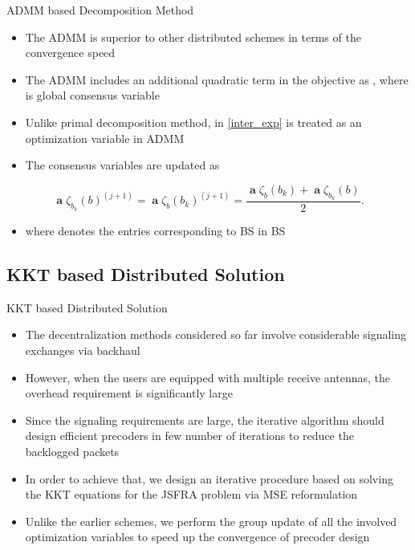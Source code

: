 \documentclass[10pt]{beamer}
\begin{document}
\begin{frame}{ADMM based Decomposition Method}
	\begin{itemize}
		\item The \ac{ADMM} is superior to other distributed schemes in terms of the convergence speed
		\item The \ac{ADMM} includes an additional quadratic term in the objective as , where  is global consensus variable
		\item Unlike primal decomposition method,  in \eqref{inter_exp} is treated as an optimization variable in \ac{ADMM}
		\item The consensus variables are updated as
	\end{itemize}
	\begin{equation}
	\mbfa{\zeta}_{b_k}(b)^{(j+1)} = \mbfa{\zeta}_{b}(b_k)^{(j+1)} = \frac{\mbfa{\zeta}_{b}(b_k) + \mbfa{\zeta}_{b_k}(b)}{2}.
	\label{if-sg-update}
	\end{equation}
	\begin{itemize}
		\item where  denotes the entries corresponding to \ac{BS}  in \ac{BS} 
	\end{itemize}
\end{frame}

\subsection{KKT based Distributed Solution}

\begin{frame}{KKT based Distributed Solution}
	\begin{itemize}
		\item The decentralization methods considered so far involve considerable signaling exchanges via backhaul
		\item However, when the users are equipped with multiple receive antennas, the overhead requirement is significantly large
		\item Since the signaling requirements are large, the iterative algorithm should design efficient precoders in few number of iterations to reduce the backlogged packets
		\item In order to achieve that, we design an iterative procedure based on solving the \ac{KKT} equations for the \acs{JSFRA} problem via \acs{MSE} reformulation
		\item Unlike the earlier schemes, we perform the group update of all the involved optimization variables to speed up the convergence of precoder design
	\end{itemize}
\end{frame}
\end{document}
